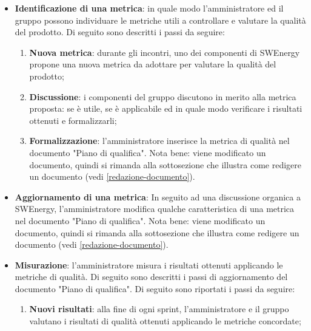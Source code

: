 \begin{itemize}
	\item \textbf{Identificazione di una metrica}: in quale modo
	      l'amministratore ed il gruppo possono individuare le metriche utili a
	      controllare e valutare la qualità del prodotto. Di seguito sono
	      descritti i passi da seguire:
	      \begin{enumerate}
		      \item \textbf{Nuova metrica}: durante gli incontri, uno dei
		            componenti di SWEnergy propone una nuova metrica da adottare
		            per valutare la qualità del prodotto;

		      \item \textbf{Discussione}: i componenti del gruppo discutono in
		            merito alla metrica proposta: se è utile, se è applicabile
		            ed in quale modo verificare i risultati ottenuti e
		            formalizzarli;

		      \item \textbf{Formalizzazione}: l'amministratore inserisce la
		            metrica di qualità nel documento "Piano di qualifica". Nota
		            bene: viene modificato un documento, quindi si rimanda alla
		            sottosezione che illustra come redigere un documento
		            (vedi \autoref{redazione-documento}).
	      \end{enumerate}

	\item \textbf{Aggiornamento di una metrica}: In seguito ad una discussione
	      organica a SWEnergy, l'amministratore modifica qualche caratteristica
	      di una metrica nel documento "Piano di qualifica". Nota bene:
	      viene modificato un documento, quindi si rimanda alla
	      sottosezione che illustra come redigere un documento
	      (vedi \autoref{redazione-documento}).

	\item \textbf{Misurazione}: l'amministratore misura i risultati ottenuti
	      applicando le metriche di qualità. Di seguito sono descritti i passi
	      di aggiornamento del documento "Piano di qualifica". Di seguito sono
	      riportati i passi da seguire:
	      \begin{enumerate}
		      \item \textbf{Nuovi risultati}: alla fine di ogni sprint,
		            l'amministratore e il gruppo valutano i risultati di qualità
		            ottenuti applicando le metriche concordate;


\end{enumerate}
\end{itemize}
